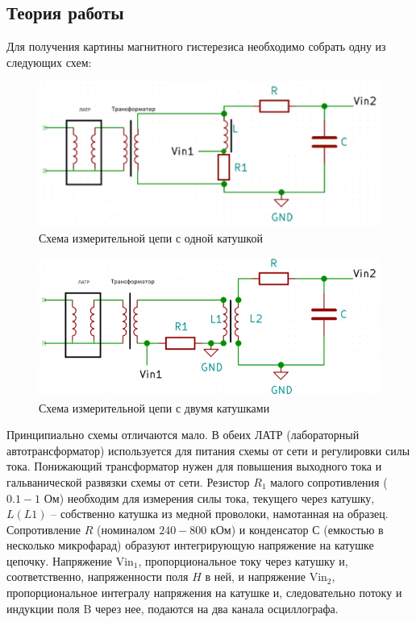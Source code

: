 \documentclass[a4paper,14pt]{extarticle}
\begin{document}
	\subsection{Теория работы}
	Для получения картины магнитного гистерезиса необходимо собрать одну из следующих схем:
	\begin{figure}[h]
		\centering
		\includegraphics[width=0.9\linewidth]{схема2.png}
		\caption{Схема измерительной цепи с одной катушкой}
		\label{fig3}
	\end{figure}
	\newline
	\begin{figure}[h]
		\centering
		\includegraphics[width=0.9\linewidth]{схема3.png}
		\caption{Схема измерительной цепи с двумя катушками}
		\label{fig3}
	\end{figure}
	\newpage
	Принципиально схемы отличаются мало. В обеих ЛАТР (лабораторный автотрансформатор) используется для питания схемы от сети и регулировки силы тока. Понижающий трансформатор нужен для повышения выходного тока и гальванической развязки схемы от сети. Резистор $R_1$ малого сопротивления ($0.1-1$ Ом) необходим для измерения силы тока, текущего через катушку, $L (L1)$ – собственно катушка из медной проволоки, намотанная на образец. Сопротивление $R$ (номиналом $240 - 800$ кОм) и	конденсатор $С$ (емкостью в несколько микрофарад) образуют интегрирующую напряжение на катушке цепочку. Напряжение ${\text{Vin}}_1$, пропорциональное току через катушку и, соответственно, напряженности поля $H$ в ней, и напряжение ${\text{Vin}}_2$, пропорциональное интегралу напряжения на катушке и, следовательно потоку и индукции поля B через нее, подаются на два канала осциллографа. 
\end{document}
